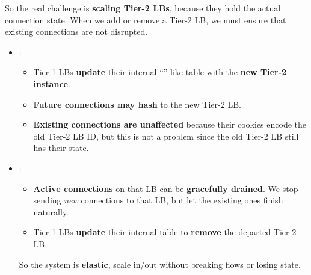 \highspace
So the real challenge is \textbf{scaling Tier-2 LBs}, because they hold the actual connection state. When we add or remove a Tier-2 LB, we must ensure that existing connections are not disrupted.
\begin{itemize}
    \item {}:
    \begin{itemize}
        \item Tier-1 LBs \textbf{update} their internal ``''-like table with the \textbf{new Tier-2 instance}.
        \item \textbf{Future connections may hash} to the new Tier-2 LB.
        \item \textbf{Existing connections are unaffected} because their cookies encode the old Tier-2 LB ID, but this is not a problem since the old Tier-2 LB still has their state.
    \end{itemize}


    \item {}:
    \begin{itemize}
        \item \textbf{Active connections} on that LB can be \textbf{gracefully drained}. We stop sending \emph{new} connections to that LB, but let the existing ones finish naturally.
        \item Tier-1 LBs \textbf{update} their internal table to \textbf{remove} the departed Tier-2 LB.
    \end{itemize}
    So the system is \textbf{elastic}, scale in/out without breaking flows or losing state.
\end{itemize}
